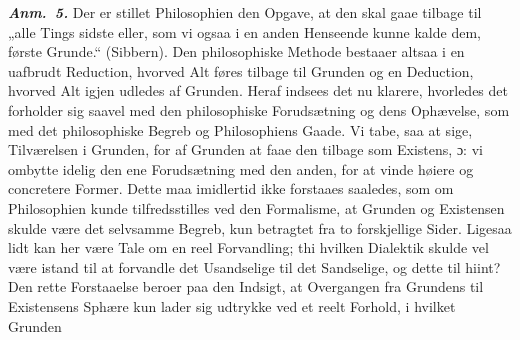 \documentclass[12pt]{book}
\newcommand{\deel}[2]{%
  \par\vspace{1.2\baselineskip}%
  \noindent\rule{\linewidth}{1.2pt}\par\vspace{2pt}%
  \noindent\rule{\linewidth}{0.4pt}\par\vspace{0.9\baselineskip}%
  \begin{center}
    {\large\bfseries Den propædeutiske Logiks\par}\vspace{0.35\baselineskip}
    {\bfseries #1\par}\vspace{0.35\baselineskip}
    {\Large\bfseries\emph{#2}\par}
  \end{center}
  \vspace{0.45\baselineskip}
  \begin{center}\rule{0.20\linewidth}{0.4pt}\end{center}
  \vspace{0.45\baselineskip}
  \phantomsection
  \addcontentsline{toc}{section}{\texorpdfstring{#1\quad #2}{#1 #2}}%
  \markboth{#1\ #2}{#1\ #2}%
}
\newcommand{\parag}[2]{%
  \par\vspace{0.9\baselineskip}%
  \begin{center}
    {\bfseries \S\,#1.\par}\vspace{0.2\baselineskip}
    {\bfseries #2\par}
  \end{center}
  \vspace{0.25\baselineskip}
  \phantomsection
  \addcontentsline{toc}{subsubsection}{\texorpdfstring{\S\,#1.\quad #2}{§ #1. #2}}%
}
\newcommand{\anm}[1]{\emph{\textbf{Anm.~#1.}}}
\newcommand{\dsi}{\textup{ɔ:}}
\newcommand{\secrule}{\begin{center}%
  \rule{0.20\linewidth}{0.4pt}\\[1.3pt]\rule{0.20\linewidth}{0.4pt}\end{center}}
\newcommand{\opage}[1]{\marginnote{\footnotesize\textit{[#1]}}}
\begin{document}
\anm{5} Der er stillet Philosophien den Opgave, at den skal gaae tilbage til „alle
Tings sidste eller, som vi ogsaa i en anden Henseende kunne kalde dem, første
Grunde.“ (Sibbern). Den philosophiske Methode bestaaer altsaa i en uafbrudt
Reduction, hvorved Alt føres tilbage til Grunden og en Deduction, hvorved Alt igjen
udledes af Grunden. Heraf indsees det nu klarere, hvorledes det forholder sig saavel
med den philosophiske Forudsætning og dens Ophævelse, som med det philosophiske
Begreb og Philosophiens Gaade. Vi tabe, saa at sige, Tilværelsen i Grunden, for af
Grunden at faae den tilbage som Existens, \dsi{} vi ombytte idelig den ene
Forudsætning med den anden, for at vinde høiere og concretere Former. Dette maa
imidlertid ikke forstaaes saaledes, som om Philosophien kunde tilfredsstilles ved den
Formalisme, at Grunden og Existensen skulde være det selvsamme Begreb, kun betragtet
fra to forskjellige Sider. Ligesaa lidt kan her være Tale om en reel Forvandling; thi
hvilken Dialektik skulde vel være istand til at forvandle det Usandselige til det
Sandselige, og dette til hiint? Den rette Forstaaelse beroer paa den Indsigt, at
Overgangen fra Grundens til Existensens Sphære kun lader sig udtrykke ved et reelt
Forhold, i hvilket Grunden
\opage{132} %
%
%
%
\end{document}
